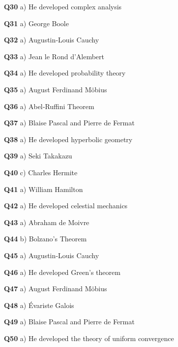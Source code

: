 \textbf{Q30} a) He developed complex analysis\par
\textbf{Q31} a) George Boole\par
\textbf{Q32} a) Augustin‑Louis Cauchy\par
\textbf{Q33} a) Jean le Rond d'Alembert\par
\textbf{Q34} a) He developed probability theory\par
\textbf{Q35} a) August Ferdinand Möbius\par
\textbf{Q36} a) Abel‑Ruffini Theorem\par
\textbf{Q37} a) Blaise Pascal and Pierre de Fermat\par
\textbf{Q38} a) He developed hyperbolic geometry\par
\textbf{Q39} a) Seki Takakazu\par
\textbf{Q40} c) Charles Hermite\par
\textbf{Q41} a) William Hamilton\par
\textbf{Q42} a) He developed celestial mechanics\par
\textbf{Q43} a) Abraham de Moivre\par
\textbf{Q44} b) Bolzano's Theorem\par
\textbf{Q45} a) Augustin‑Louis Cauchy\par
\textbf{Q46} a) He developed Green's theorem\par
\textbf{Q47} a) August Ferdinand Möbius\par
\textbf{Q48} a) Évariste Galois\par
\textbf{Q49} a) Blaise Pascal and Pierre de Fermat\par
\textbf{Q50} a) He developed the theory of uniform convergence\par